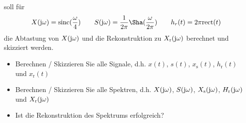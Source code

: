 soll für
\begin{align}
X(\im\omega) = \mathrm{sinc}(\frac{\omega}{4})\qquad
%
S(\im\omega)=\frac{1}{2\pi} \Sha(\frac{\omega}{2\pi})\qquad
%
h_r(t) = 2\pi\mathrm{rect}(t)
\end{align}
die Abtastung von $X(\im\omega)$ und die Rekonstruktion zu $X_\mathrm{r}(\im\omega)$
berechnet und skizziert werden.

\begin{itemize}
  \item Berechnen / Skizzieren Sie alle Signale, d.h. $x(t)$, $s(t)$, $x_\mathrm{s}(t)$, $h_\mathrm{r}(t)$ und $x_\mathrm{r}(t)$
  \item Berechnen / Skizzieren Sie alle Spektren, d.h.  $X(\im\omega)$, $S(\im\omega)$, $X_\mathrm{s}(\im\omega)$, $H_\mathrm{r}(\im\omega)$ und $X_\mathrm{r}(\im\omega)$
  \item Ist die Rekonstruktion des Spektrums erfolgreich?
\end{itemize}

